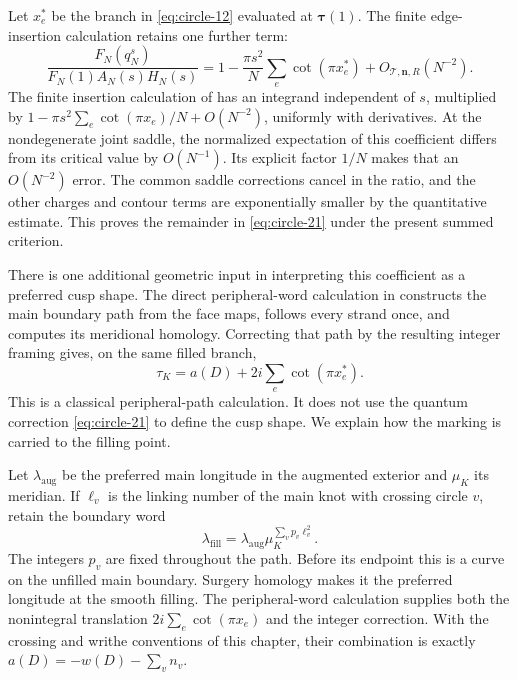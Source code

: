 Let \(x_e^*\) be the branch in \eqref{eq:circle-12} evaluated at \(\boldsymbol\tau(1)\).
The finite edge-insertion calculation retains one further term: \begin{equation}
 \frac{F_N(q_N^s)}{F_N(1)A_N(s)H_N(s)}
 =1-\frac{\pi s^2}{N}\sum_e\cot(\pi x_e^*)
                 +O_{\mathcal T,\mathbf n,R}(N^{-2}).
 \label{eq:circle-21}
\end{equation} The finite insertion calculation of
\cite[Theorem~1.2 and Section~6.6]{CircleTreeVolume}
has an integrand independent of \(s\), multiplied by
\(1-\pi s^2\sum_e\cot(\pi x_e)/N+O(N^{-2})\), uniformly with derivatives.
At the nondegenerate joint saddle, the normalized expectation of this
coefficient differs from its critical value by \(O(N^{-1})\).
Its explicit factor \(1/N\) makes that an \(O(N^{-2})\) error.
The common saddle corrections cancel in the ratio, and the other
charges and contour terms are exponentially smaller by the quantitative
estimate. This proves the remainder in \eqref{eq:circle-21} under the
present summed criterion.

There is one additional geometric input in interpreting this
coefficient as a preferred cusp shape. The direct peripheral-word
calculation in
\cite[Section~5]{PreferredLongitudes}
constructs the main boundary path from the face maps, follows every
strand once, and computes its meridional homology. Correcting that path
by the resulting integer framing gives, on the same filled branch,
\begin{equation}
                   \tau_K=a(D)+2i\sum_e\cot(\pi x_e^*).
 \label{eq:circle-22}
\end{equation}
This is a classical peripheral-path calculation. It does not use the
quantum correction \eqref{eq:circle-21} to define the cusp shape.
We explain how the marking is carried to the filling point.

Let \(\lambda_{\mathrm{aug}}\) be the preferred main longitude in
the augmented exterior and \(\mu_K\) its meridian. If \(\ell_v\)
is the linking number of the main knot with crossing circle \(v\),
retain the boundary word
\[
 \lambda_{\mathrm{fill}}=\lambda_{\mathrm{aug}}
                \mu_K^{\sum_vp_v\ell_v^2}.
\]
The integers \(p_v\) are fixed throughout the path. Before its
endpoint this is a curve on the unfilled main boundary. Surgery
homology makes it the preferred longitude at the smooth filling.
The peripheral-word calculation supplies both the nonintegral
translation \(2i\sum_e\cot(\pi x_e)\) and the integer correction.
With the crossing and writhe conventions of this chapter, their
combination is exactly \(a(D)=-w(D)-\sum_vn_v\).

